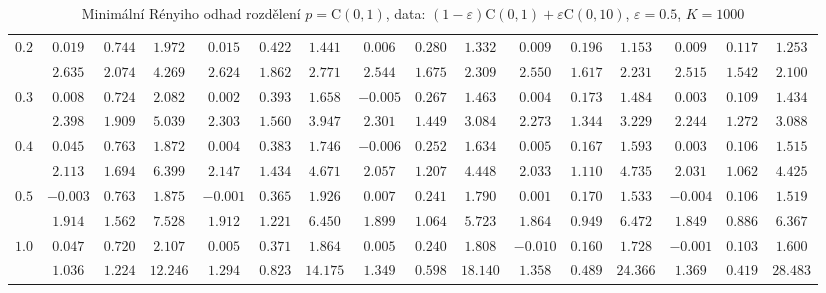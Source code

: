 \begin{table}[ht]
\begin{center}
\begin{tabular}{|c|ccc|ccc|ccc|ccc|ccc|}
\hline 
$0.2$ & $ 0.019 $ & $ 0.744 $ & $ 1.972 $ & $ 0.015 $ & $ 0.422 $ & $ 1.441 $ & $ 0.006 $ & $ 0.280 $ & $ 1.332 $ & $ 0.009 $ & $ 0.196 $ & $ 1.153 $ & $ 0.009 $ & $ 0.117 $ & $ 1.253 $\\ 
 & $ 2.635 $ & $ 2.074 $ & $ 4.269 $ & $ 2.624 $ & $ 1.862 $ & $ 2.771 $ & $ 2.544 $ & $ 1.675 $ & $ 2.309 $ & $ 2.550 $ & $ 1.617 $ & $ 2.231 $ & $ 2.515 $ & $ 1.542 $ & $ 2.100 $\\ 
\hline 
$0.3$ & $ 0.008 $ & $ 0.724 $ & $ 2.082 $ & $ 0.002 $ & $ 0.393 $ & $ 1.658 $ & $ -0.005 $ & $ 0.267 $ & $ 1.463 $ & $ 0.004 $ & $ 0.173 $ & $ 1.484 $ & $ 0.003 $ & $ 0.109 $ & $ 1.434 $\\ 
 & $ 2.398 $ & $ 1.909 $ & $ 5.039 $ & $ 2.303 $ & $ 1.560 $ & $ 3.947 $ & $ 2.301 $ & $ 1.449 $ & $ 3.084 $ & $ 2.273 $ & $ 1.344 $ & $ 3.229 $ & $ 2.244 $ & $ 1.272 $ & $ 3.088 $\\ 
\hline 
$0.4$ & $ 0.045 $ & $ 0.763 $ & $ 1.872 $ & $ 0.004 $ & $ 0.383 $ & $ 1.746 $ & $ -0.006 $ & $ 0.252 $ & $ 1.634 $ & $ 0.005 $ & $ 0.167 $ & $ 1.593 $ & $ 0.003 $ & $ 0.106 $ & $ 1.515 $\\ 
 & $ 2.113 $ & $ 1.694 $ & $ 6.399 $ & $ 2.147 $ & $ 1.434 $ & $ 4.671 $ & $ 2.057 $ & $ 1.207 $ & $ 4.448 $ & $ 2.033 $ & $ 1.110 $ & $ 4.735 $ & $ 2.031 $ & $ 1.062 $ & $ 4.425 $\\ 
\hline 
$0.5$ & $ -0.003 $ & $ 0.763 $ & $ 1.875 $ & $ -0.001 $ & $ 0.365 $ & $ 1.926 $ & $ 0.007 $ & $ 0.241 $ & $ 1.790 $ & $ 0.001 $ & $ 0.170 $ & $ 1.533 $ & $ -0.004 $ & $ 0.106 $ & $ 1.519 $\\ 
 & $ 1.914 $ & $ 1.562 $ & $ 7.528 $ & $ 1.912 $ & $ 1.221 $ & $ 6.450 $ & $ 1.899 $ & $ 1.064 $ & $ 5.723 $ & $ 1.864 $ & $ 0.949 $ & $ 6.472 $ & $ 1.849 $ & $ 0.886 $ & $ 6.367 $\\ 
\hline 
$1.0$ & $ 0.047 $ & $ 0.720 $ & $ 2.107 $ & $ 0.005 $ & $ 0.371 $ & $ 1.864 $ & $ 0.005 $ & $ 0.240 $ & $ 1.808 $ & $ -0.010 $ & $ 0.160 $ & $ 1.728 $ & $ -0.001 $ & $ 0.103 $ & $ 1.600 $\\ 
 & $ 1.036 $ & $ 1.224 $ & $ 12.246 $ & $ 1.294 $ & $ 0.823 $ & $ 14.175 $ & $ 1.349 $ & $ 0.598 $ & $ 18.140 $ & $ 1.358 $ & $ 0.489 $ & $ 24.366 $ & $ 1.369 $ & $ 0.419 $ & $ 28.483 $\\ 
\hline 
\end{tabular}
\caption{Minimální Rényiho odhad rozdělení $p = \mathrm{C}(0,1)$, data: $(1-\varepsilon)\mathrm{C}(0,1) + \varepsilon \mathrm{C}(0,10)$, $\varepsilon =  0.5$, $K = 1000$} 
\end{center}
\end{table}

%
